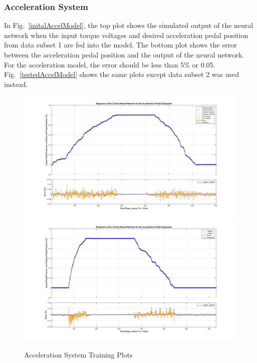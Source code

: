 \documentclass[conference]{IEEEtran}
\begin{document}
\subsubsection{Acceleration System}
%
In Fig.~\ref{initalAccelModel}, the top plot shows the simulated output of the neural network when the input torque voltages and desired acceleration pedal position from data subset 1 are fed into the model. The bottom plot shows the error between the acceleration pedal position and the output of the neural network. For the acceleration model, the error should be less than 5\% or 0.05. Fig.~\ref{testedAccelModel} shows the same plots except data subset 2 was used instead.

\begin{figure}[htbp]
	\centering
		{\includegraphics[width=0.90\linewidth]{figs/img/accelNeuralNetworkTrainedOutput}}
		{\includegraphics[width=0.90\linewidth]{figs/img/accelNeuralNetworkTrainedOutput2}}
	\caption{Acceleration System Training Plots}
\end{figure}
\end{document}
